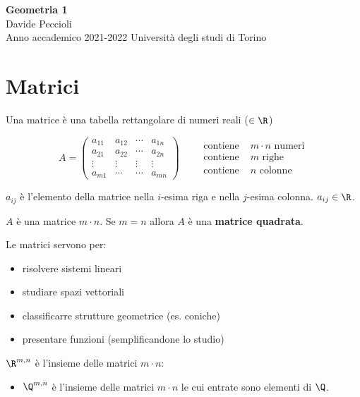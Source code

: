 \documentclass[twoside, 11pt, titlepage]{article}
\begin{document}
\begin{titlepage}
\null
\vfill
\begin{center}
{\Huge \textbf{Geometria 1}}\\
\vspace{1em}
{\large Davide Peccioli}\\
\vspace{0.6em}
{\large Anno accademico 2021-2022}
\vfill
Università degli studi di Torino
\end{center}
\end{titlepage}
{\pagestyle{empty}
\null\newpage}

\tableofcontents\cleardoublepage

\section{Matrici}

Una matrice è una tabella rettangolare di numeri reali ($\in\R$)

\[
A=\begin{pmatrix}
a_{1 1} & a_{1 2} & \cdots & a_{1 n} \\
a_{2 1} & a_{2 2} & \cdots & a_{2 n}\\
\vdots & \vdots & \vdots & \vdots \\
a_{m 1} & \cdots & \cdots & a_{m n}
\end{pmatrix}\qquad \begin{aligned}
\text{contiene } &m\cdot n \text{ numeri}\\
\text{contiene } &m \text{ righe}\\
\text{contiene } &n \text{ colonne}
\end{aligned}
\]

$a_{ij}$ è l'elemento della matrice nella $i$-esima riga e nella $j$-esima colonna. $a_{ij}\in\R$.

$A$ è una matrice $m\cdot n$. Se $m=n$ allora $A$ è una \textbf{matrice quadrata}.

Le matrici servono per:
\begin{itemize}
\item risolvere sistemi lineari
\item studiare spazi vettoriali
\item classificarre strutture geometrice (es. coniche)
\item presentare funzioni (semplificandone lo studio)
\end{itemize}

$\R^{m,n}$ è l'insieme delle matrici $m\cdot n$:
\begin{itemize}
\item $\Q^{m, n}$ è l'insieme delle matrici $m\cdot n$ le cui entrate sono elementi di $\Q$.
\end{itemize}
\end{document}
